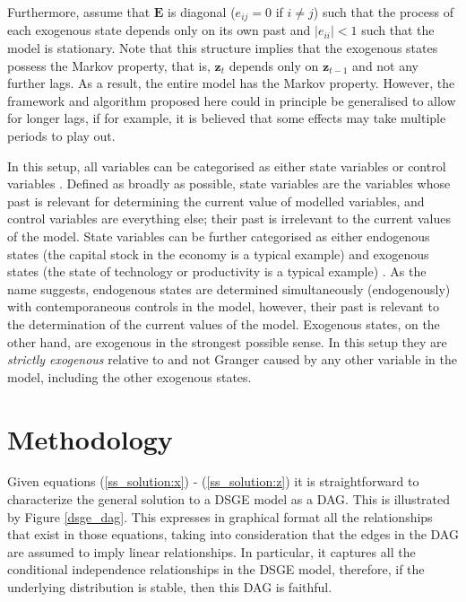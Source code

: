 \documentclass{article}
\begin{document}
Furthermore, assume that $\mathbf{E}$ is diagonal ($e_{ij} = 0$ if $i \not = j$) such that the process of each exogenous state depends only on its own past and $|e_{ii}| < 1$ such that the model is stationary. Note that this structure implies that the exogenous states possess the Markov property, that is, $\mathbf{z}_t$ depends only on $\mathbf{z}_{t-1}$ and not any further lags. As a result, the entire model has the Markov property. However, the framework and algorithm proposed here could in principle be generalised to allow for longer lags, if for example, it is believed that some effects may take multiple periods to play out.

In this setup, all variables can be categorised as either state variables or control variables \parencite{fernandez2016solution}. Defined as broadly as possible, state variables are the variables whose past is relevant for determining the current value of modelled variables, and control variables are everything else; their past is irrelevant to the current values of the model. State variables can be further categorised as either endogenous states (the capital stock in the economy is a typical example) and exogenous states (the state of technology or productivity is a typical example) \parencite{ravenna2007vector}. As the name suggests, endogenous states are determined simultaneously (endogenously) with contemporaneous controls in the model, however, their past is relevant to the determination of the current values of the model. Exogenous states, on the other hand, are exogenous in the strongest possible sense. In this setup they are \textit{strictly exogenous} relative to and not Granger caused by any other variable in the model, including the other exogenous states.

\section{Methodology} \label{methodology}

Given equations (\ref{ss_solution:x}) - (\ref{ss_solution:z}) it is straightforward to characterize the general solution to a DSGE model as a DAG. This is illustrated by Figure \ref{dsge_dag}. This expresses in graphical format all the relationships that exist in those equations, taking into consideration that the edges in the DAG are assumed to imply linear relationships. In particular, it captures all the conditional independence relationships in the DSGE model, therefore, if the underlying distribution is stable, then this DAG is faithful. 
\end{document}
